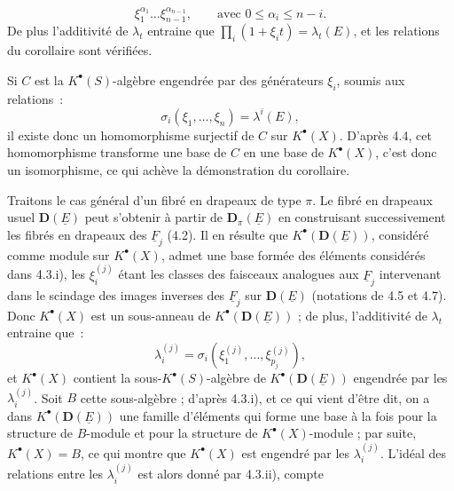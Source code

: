 
\[
  \xi_1^{\alpha_1}\ldots\xi_{n-1}^{\alpha_{n-1}},
  \qquad
\text{avec } 0\le\alpha_i\le n-i.
\]
De plus l'additivité de \(\lambda_t\) entraine que \(\prod_i(1+\xi_i t)=\lambda_t(E)\), et les relations du corollaire sont vérifiées.

Si \(C\) est la \(K^{\bullet}(S)\)-algèbre engendrée par des générateurs \(\xi_i\), soumis aux relations~:
\[
  \sigma_i(\xi_1,\ldots,\xi_n)=\lambda^i(E),
\]
il existe donc un homomorphisme surjectif de \(C\) sur \(K^{\bullet}(X)\). D'après 4.4, cet homomorphisme transforme une base de \(C\) en une base de \(K^{\bullet}(X)\), c'est donc un isomorphisme, ce qui achève la démonstration du corollaire.

Traitons le cas général d'un fibré en drapeaux de type \(\pi\). Le fibré en drapeaux usuel \(\mathbf D(\underline{E})\) peut s'obtenir à partir de \(\mathbf D_\pi(\underline{E})\) en construisant successivement les fibrés en drapeaux des \(\underline{F}_j\) (4.2). Il en résulte que \(K^{\bullet}(\mathbf D(\underline{E}))\), considéré comme module sur \(K^{\bullet}(X)\), admet une base formée des éléments considérés dans 4.3.i), les \(\xi_i^{(j)}\) étant les classes des faisceaux analogues aux \(\underline{F}_j\) intervenant dans le scindage des images inverses des \(\underline{F}_j\) sur \(\mathbf D(\underline{E})\) (notations de 4.5 et 4.7). Donc \(K^{\bullet}(X)\) est un sous-anneau de \(K^{\bullet}(\mathbf D(\underline{E}))\) ; de plus, l'additivité de \(\lambda_t\) entraine que~:
\[
  \lambda_i^{(j)}=\sigma_i(\xi_1^{(j)},\ldots,\xi_{p_j}^{(j)}),
\]
et \(K^{\bullet}(X)\) contient la sous-\(K^{\bullet}(S)\)-algèbre de \(K^{\bullet}(\mathbf D(\underline{E}))\) engendrée par les \(\lambda_i^{(j)}\). Soit \(B\) cette sous-algèbre ; d'après 4.3.i), et ce qui vient d'être dit, on a dans \(K^{\bullet}(\mathbf D(\underline{E}))\) une famille d'éléments qui forme une base à la fois pour la structure de \(B\)-module et pour la structure de \(K^{\bullet}(X)\)-module ; par suite, \(K^{\bullet}(X)=B\), ce qui montre que \(K^{\bullet}(X)\) est engendré par les \(\lambda_i^{(j)}\). L'idéal des relations entre les \(\lambda_i^{(j)}\) est alors donné par 4.3.ii), compte
